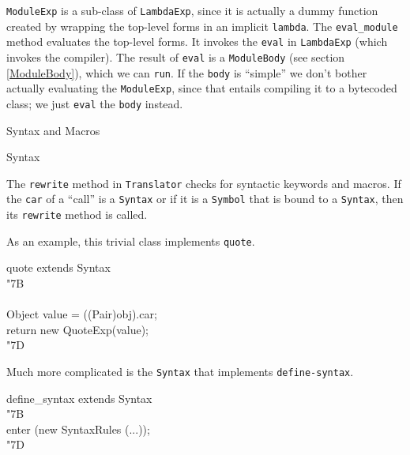 \documentclass[twocolumn]{article}
\makeatletter
\def\section{\@startsection {section}{1}{\z@}
   {14pt plus 2pt minus 2pt}{12pt plus 2pt minus 2pt} {\large\bf}}
\newcommand{\LBr}{\char"7B}
\newcommand{\RBr}{\char"7D}
\makeatother
\begin{document}
{\tt ModuleExp} is a sub-class of {\tt LambdaExp},
since it is actually a dummy function created by
wrapping the top-level forms in an implicit {\tt lambda}.
The {\tt eval\_module} method evaluates the top-level forms.
It invokes the {\tt eval} in {\tt LambdaExp} (which invokes the compiler).
The result of {\tt eval} is a {\tt ModuleBody} (see section \ref{ModuleBody}),
which we can {\tt run}.  If the {\tt body} is ``simple''
we don't bother actually evaluating the {\tt ModuleExp},
since that entails compiling it to a bytecoded class;
we just {\tt eval} the {\tt body} instead.

\section{Syntax and Macros}

\begin{Class}{Syntax}{}
\\
\end{Class}

The {\tt rewrite} method in {\tt Translator} checks for
syntactic keywords and macros.  If the {\tt car} of
a ``call'' is a {\tt Syntax} or if it is a {\tt Symbol}
that is bound to a {\tt Syntax}, then its {\tt rewrite}
method is called.

As an example, this trivial class implements {\tt quote}.

\begin{Class}{quote}{ extends Syntax}
\\
\LBr\+\\
    \\
    Object value = ((Pair)obj).car;\\
    return new QuoteExp(value);\-\\
\RBr
\end{Class}

Much more complicated is the {\tt Syntax} that implements
{\tt define-syntax}.

\begin{Class}{define\_syntax}{ extends Syntax}
\\
{\LBr}\+\\
  enter (new SyntaxRules (...));\-\\
{\RBr}\\
\end{Class}
\end{document}
